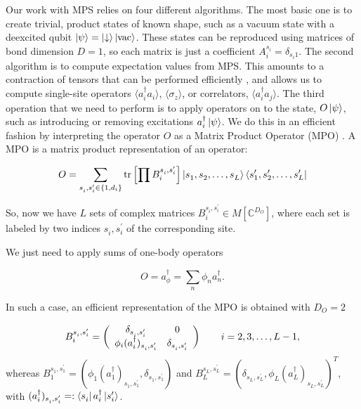 \documentclass[aps,pra,reprint,amsmath,amssymb]{revtex4-1}
\begin{document}
Our work with MPS relies on four different algorithms. The most basic one is to create trivial, product states of known shape, such as a vacuum state with a deexcited qubit $\ket{\psi}=\ket{\downarrow}\ket{\text{vac}}$. These states can be reproduced using matrices of bond dimension $D=1$, so each matrix is just a coefficient $A_i^{s_i}=\delta_{s_i1}$. The second algorithm is to compute expectation values from MPS. This amounts to a contraction of tensors that can be performed efficiently \cite{Ripoll2006}, and allows us to compute single-site operators $\langle a^\dagger_i a_i\rangle$, $\langle \sigma_z\rangle$, or correlators, $\langle a_i^\dagger a_j\rangle$. The third operation that we need to perform is to apply operators on to the state, $O\ket{\psi}$, such as introducing or removing excitations $a_i^\dagger\ket{\psi}$. We do this in an efficient fashion by interpreting the operator $O$ as a Matrix Product Operator (MPO) \cite{Pirvu2010}. A MPO is a matrix product representation of an operator:

\begin{equation}
O = \sum_{s_{i}^{},s_{i}^\prime \in \{1,d_i\}} \mathrm{tr}\left[\prod B_i^{s_i^{},s_i^\prime}\right]\ket{s_1^{},s_2^{},\ldots,s_L^{}}\bra{s_1^\prime,s_2^\prime,\ldots,s_L^\prime}
\end{equation}

So, now we have $L$ sets of complex matrices $B_i^{s_i^{},s_i^\prime} \in M[\mathbb{C}^{D_O}]$, where each set is labeled by two indices $s_i^{},s_i^\prime$ of the corresponding site.

We just need to apply sums of one-body operators

\begin{equation}
O = a_\phi^\dagger = \sum_n \phi_n a_n^\dagger.
\end{equation}

In such a case, an efficient representation of the MPO is obtained with $D_O=2$

\begin{equation}
B_i^{s_i^{},s_i^\prime}=\left(\begin{array}{c c}
\delta_{s_i^{},s_i^\prime} & 0\\
\phi_i(a_i^\dagger)_{s_i^{},s_i^\prime} & \delta_{s_i^{},s_i^\prime}
\end{array}\right)\qquad i=2,3,\dots,L-1,
\end{equation}
whereas $B_1^{s_1^{},s_1^\prime}=(\phi_1(a_1^\dagger)_{s_1^{},s_1^\prime},\delta_{s_1^{},s_1^\prime})$ and $B_L^{s_L^{},s_L^\prime}=(\delta_{s_L^{},s_L^\prime},\phi_L(a_L^\dagger)_{s_L^{},s_L^\prime})^T$, with $(a_i^\dagger)_{s_i^{},s_i^\prime}=:\bra{s_i^{}}a_i^\dagger\ket{s_i^\prime}$.
\end{document}
